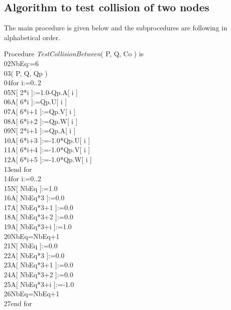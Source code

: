 \documentclass[12pt, a4paper]{article}
\begin{document}
\subsection{Algorithm to test collision of two nodes}

The main procedure is given below and the subprocedures are following in alphabetical order.\\

\begin{ttfamily}
\quad Procedure {\em TestCollisionBetween}( P, Q, Co ) is\\
02\quad\quad NbEq:=6\\
03\quad{}( P, Q, Qp )\\
04\quad\quad for i:=0..2\\
05\quad\quad\quad N[ 2*i ]:=1.0-Qp.A[ i ]\\
06\quad\quad\quad A[ 6*i ]:=Qp.U[ i ] \\
07\quad\quad\quad A[ 6*i+1 ]:=Qp.V[ i ] \\
08\quad\quad\quad A[ 6*i+2 ]:=Qp.W[ i ] \\
09\quad\quad\quad N[ 2*i+1 ]:=Qp.A[ i ]\\
10\quad\quad\quad A[ 6*i+3 ]:=-1.0*Qp.U[ i ] \\
11\quad\quad\quad A[ 6*i+4 ]:=-1.0*Qp.V[ i ] \\
12\quad\quad\quad A[ 6*i+5 ]:=-1.0*Qp.W[ i ] \\
13\quad\quad end for\\
14\quad\quad for i:=0..2\\
15\quad\quad\quad N[ NbEq ]:=1.0\\
16\quad\quad\quad A[ NbEq*3 ]:=0.0\\
17\quad\quad\quad A[ NbEq*3+1 ]:=0.0\\
18\quad\quad\quad A[ NbEq*3+2 ]:=0.0\\
19\quad\quad\quad A[ NbEq*3+i ]:=1.0\\
20\quad\quad\quad NbEq=NbEq+1\\
21\quad\quad\quad N[ NbEq ]:=0.0\\
22\quad\quad\quad A[ NbEq*3 ]:=0.0\\
23\quad\quad\quad A[ NbEq*3+1 ]:=0.0\\
24\quad\quad\quad A[ NbEq*3+2 ]:=0.0\\
25\quad\quad\quad A[ NbEq*3+i ]:=-1.0\\
26\quad\quad\quad NbEq=NbEq+1\\
27\quad\quad end for\\

\end{ttfamily}
\end{document}
